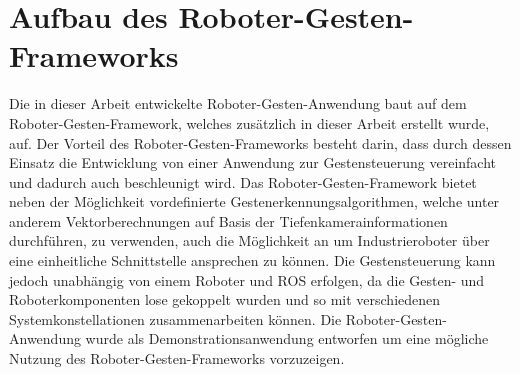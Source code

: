 
\section{Aufbau des Roboter-Gesten-Frameworks}
Die in dieser Arbeit entwickelte Roboter-Gesten-Anwendung baut auf dem Roboter-Gesten-Framework, welches zusätzlich in dieser Arbeit erstellt wurde, auf. Der Vorteil des Roboter-Gesten-Frameworks besteht darin, dass durch dessen Einsatz die Entwicklung von einer Anwendung zur Gestensteuerung vereinfacht und dadurch auch beschleunigt wird. Das Roboter-Gesten-Framework bietet neben der Möglichkeit vordefinierte Gestenerkennungsalgorithmen, welche unter anderem Vektorberechnungen auf Basis der Tiefenkamerainformationen durchführen, zu verwenden, auch die Möglichkeit an um Industrieroboter über eine einheitliche Schnittstelle ansprechen zu können. Die Gestensteuerung kann jedoch unabhängig von einem Roboter und ROS erfolgen, da die Gesten- und Roboterkomponenten lose gekoppelt wurden und so mit verschiedenen Systemkonstellationen zusammenarbeiten können. Die Roboter-Gesten-Anwendung wurde als Demonstrationsanwendung entworfen um eine mögliche Nutzung des Roboter-Gesten-Frameworks vorzuzeigen.

